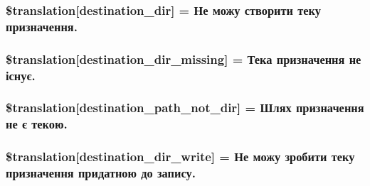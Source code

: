 \subsubsection[{\$translation}]{\setlength{\rightskip}{0pt plus 5cm}\$translation\mbox{[}\textquotesingle{}destination\+\_\+dir\textquotesingle{}\mbox{]} = \textquotesingle{}Не можу створити теку призначення.\textquotesingle{}}\label{class_8upload_8uk___u_a_8php_aff2427c72a2598aefa6d58df1dd18b08}
\hypertarget{class_8upload_8uk___u_a_8php_a9ef28d3cf09942c6c0a1e77fa09185e8}{}
\subsubsection[{\$translation}]{\setlength{\rightskip}{0pt plus 5cm}\$translation\mbox{[}\textquotesingle{}destination\+\_\+dir\+\_\+missing\textquotesingle{}\mbox{]} = \textquotesingle{}Тека призначення не існує.\textquotesingle{}}\label{class_8upload_8uk___u_a_8php_a9ef28d3cf09942c6c0a1e77fa09185e8}
\hypertarget{class_8upload_8uk___u_a_8php_a5704a67137126e8c87b7a364175929d4}{}
\subsubsection[{\$translation}]{\setlength{\rightskip}{0pt plus 5cm}\$translation\mbox{[}\textquotesingle{}destination\+\_\+path\+\_\+not\+\_\+dir\textquotesingle{}\mbox{]} = \textquotesingle{}Шлях призначення не є текою.\textquotesingle{}}\label{class_8upload_8uk___u_a_8php_a5704a67137126e8c87b7a364175929d4}
\hypertarget{class_8upload_8uk___u_a_8php_a97608ea194a616db49141a0e6dee900c}{}
\subsubsection[{\$translation}]{\setlength{\rightskip}{0pt plus 5cm}\$translation\mbox{[}\textquotesingle{}destination\+\_\+dir\+\_\+write\textquotesingle{}\mbox{]} = \textquotesingle{}Не можу зробити теку призначення придатною до запису.\textquotesingle{}}\label{class_8upload_8uk___u_a_8php_a97608ea194a616db49141a0e6dee900c}
\hypertarget{class_8upload_8uk___u_a_8php_a40e4e1962226b89fd76da5819a9602b0}{}
